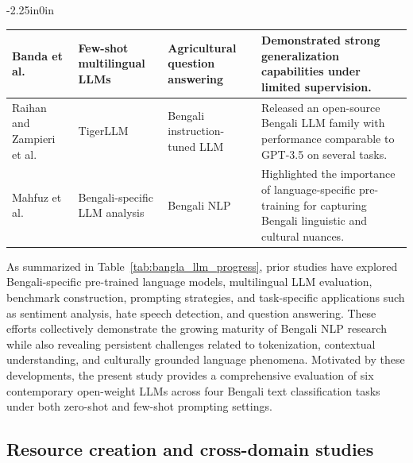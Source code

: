 \documentclass[10pt,letterpaper]{article}
\begin{document}
\begin{table}[H]
\begin{adjustwidth}{-2.25in}{0in}
\begin{tabular}{|>{\raggedright\arraybackslash}p{3cm}|>{\raggedright\arraybackslash}p{3.0cm}|>{\raggedright\arraybackslash}p{3.0cm}|>{\raggedright\arraybackslash}p{8.1cm}|}
\hline
Banda et al.~\cite{b9} & Few-shot multilingual LLMs & Agricultural question answering & Demonstrated strong generalization capabilities under limited supervision. \\
\hline
Raihan and Zampieri et al.~\cite{b10} & TigerLLM & Bengali instruction-tuned LLM & Released an open-source Bengali LLM family with performance comparable to GPT-3.5 on several tasks. \\
\hline
Mahfuz et al.~\cite{b11} & Bengali-specific LLM analysis & Bengali NLP & Highlighted the importance of language-specific pre-training for capturing Bengali linguistic and cultural nuances. \\
\hline
\end{tabular}
\end{adjustwidth}
\end{table}

As summarized in Table~\ref{tab:bangla_llm_progress}, prior studies have explored Bengali-specific pre-trained language models, multilingual LLM evaluation, benchmark construction, prompting strategies, and task-specific applications such as sentiment analysis, hate speech detection, and question answering. These efforts collectively demonstrate the growing maturity of Bengali NLP research while also revealing persistent challenges related to tokenization, contextual understanding, and culturally grounded language phenomena. Motivated by these developments, the present study provides a comprehensive evaluation of six contemporary open-weight LLMs across four Bengali text classification tasks under both zero-shot and few-shot prompting settings.



\subsection*{Resource creation and cross-domain studies}
\end{document}
